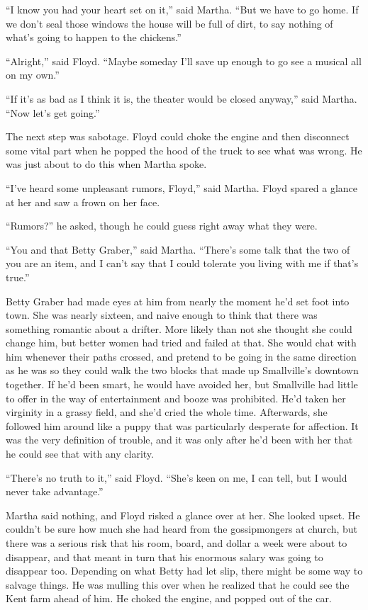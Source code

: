 \documentclass[ebook,12pt]{memoir}
\begin{document}
``I know you had your heart set on it,'' said Martha. ``But we have to
go home. If we don't seal those windows the house will be full of dirt,
to say nothing of what's going to happen to the chickens.''

``Alright,'' said Floyd. ``Maybe someday I'll save up enough to go see a
musical all on my own.''

``If it's as bad as I think it is, the theater would be closed anyway,''
said Martha. ``Now let's get going.''

The next step was sabotage. Floyd could choke the engine and then
disconnect some vital part when he popped the hood of the truck to see
what was wrong. He was just about to do this when Martha spoke.

``I've heard some unpleasant rumors, Floyd,'' said Martha. Floyd spared
a glance at her and saw a frown on her face.

``Rumors?'' he asked, though he could guess right away what they were.

``You and that Betty Graber,'' said Martha. ``There's some talk that the
two of you are an item, and I can't say that I could tolerate you living
with me if that's true.''

Betty Graber had made eyes at him from nearly the moment he'd set foot
into town. She was nearly sixteen, and naive enough to think that there
was something romantic about a drifter. More likely than not she thought
she could change him, but better women had tried and failed at that. She
would chat with him whenever their paths crossed, and pretend to be
going in the same direction as he was so they could walk the two blocks
that made up Smallville's downtown together. If he'd been smart, he
would have avoided her, but Smallville had little to offer in the way of
entertainment and booze was prohibited. He'd taken her virginity in a
grassy field, and she'd cried the whole time. Afterwards, she followed
him around like a puppy that was particularly desperate for affection.
It was the very definition of trouble, and it was only after he'd been
with her that he could see that with any clarity.

``There's no truth to it,'' said Floyd. ``She's keen on me, I can tell,
but I would never take advantage.''

Martha said nothing, and Floyd risked a glance over at her. She looked
upset. He couldn't be sure how much she had heard from the gossipmongers
at church, but there was a serious risk that his room, board, and dollar
a week were about to disappear, and that meant in turn that his enormous
salary was going to disappear too. Depending on what Betty had let slip,
there might be some way to salvage things. He was mulling this over when
he realized that he could see the Kent farm ahead of him. He choked the
engine, and popped out of the car.
\end{document}
